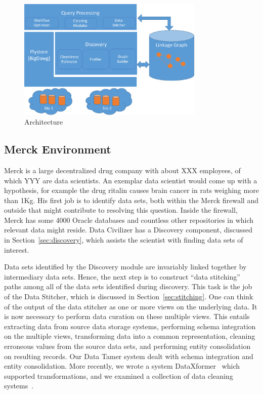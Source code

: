 \begin{figure}
\includegraphics[width=3.5in]{arch2.pdf}
\caption{\dcv Architecture}
\label{fig:arch}
\end{figure}

    

\subsection{Merck Environment}

Merck is a large decentralized drug company with about XXX employees, of which
YYY are data scientists.  An exemplar data scientist would come up with a
hypothesis, for example the drug ritalin causes brain cancer in rats weighing
more than 1Kg.  His first job is to identify data sets, both within the Merck
firewall and outside that might contribute to resolving this question.  Inside
the firewall, Merck has some 4000 Oracle databases and countless other
repositories in which relevant data might reside.  Data Civilizer has a
Discovery component, discussed in Section~\ref{sec:discovery}, 
which assists the scientist with finding data sets of interest.

Data sets identified by the Discovery module are invariably linked together by
intermediary data sets.  Hence, the next step is to construct ``data stitching''
paths among all of the data sets identified during discovery.  This task is the
job of the Data Stitcher, which is discussed in Section~\ref{sec:stitching}. One can think of the
output of the data stitcher as one or more views on the underlying data. It is
now necessary to perform data curation on these multiple views.  This entails
extracting data from source data storage systems, performing schema integration
on the multiple views, transforming data into a common representation, cleaning
erroneous values from the source data sets, and performing entity consolidation
on resulting records.  Our Data Tamer system\cite{DBLP:conf/cidr/StonebrakerBIBCZPX13} dealt with schema integration
and entity consolidation.  More recently, we wrote a system DataXformer~\cite{DBLP:conf/icde/AbedjanMIOPS16}
which supported transformations, and we examined a collection of data cleaning
systems~\cite{evaluatioin}.

